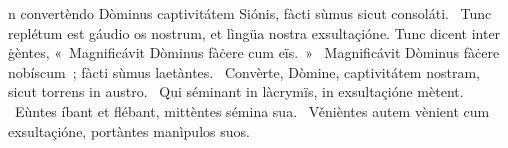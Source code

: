 \psalmChapterWithInscription{}
{ }
{%
n convertèndo Dòminus captivitátem Siónis, fàcti sùmus sicut consoláti. 
~Tunc replétum est gáudio os nostrum, et lìngüa nostra exsultaçióne. Tunc dicent inter ġèntes, «~Magnificávit Dòminus fàċere cum eïs.~»
~Magnificávit Dòminus fàċere nobíscum~; fàcti sùmus laetàntes. 
~Convèrte, Dòmine, captivitátem nostram, sicut torrens in austro. 
~Qui séminant in làcrymïs, in exsultaçióne mètent. 
~Eùntes íbant et flébant, mittèntes sémina sua. 
~Věnièntes autem vènient cum exsultaçióne, portàntes manìpulos suos. 
}
